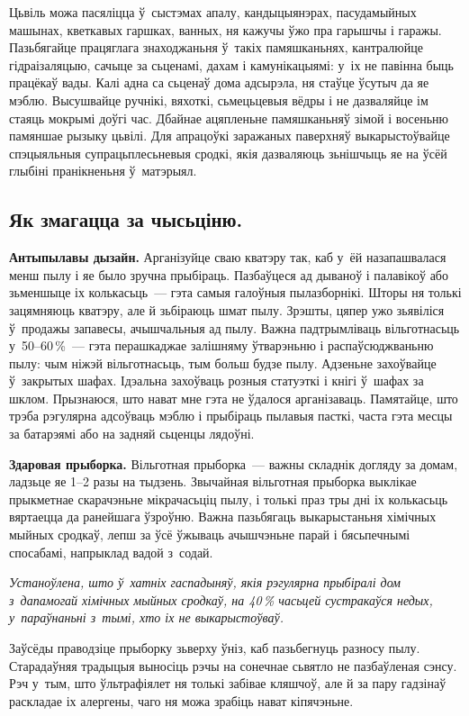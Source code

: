Цьвіль можа пасяліцца ў~сыстэмах апалу, кандыцыянэрах, пасудамыйных машынах, кветкавых гаршках, ванных, ня кажучы ўжо пра гарышчы і гаражы. Пазьбягайце працяглага знаходжаньня ў~такіх памяшканьнях, кантралюйце гідраізаляцыю, сачыце за сьценамі, дахам і камунікацыямі: у~іх не павінна быць працёкаў вады. Калі адна са сьценаў дома адсырэла, ня стаўце ўсутыч да яе мэблю. Высушвайце ручнікі, вяхоткі, сьмецьцевыя вёдры і не дазваляйце ім стаяць мокрымі доўгі час. Дбайнае ацяпленьне памяшканьняў зімой і восеньню памяншае рызыку цьвілі. Для апрацоўкі заражаных паверхняў выкарыстоўвайце спэцыяльныя супрацьплесьневыя сродкі, якія дазваляюць зьнішчыць яе на ўсёй глыбіні пранікненьня ў~матэрыял.

\subsection*{Як змагацца за чысьціню.}

\textbf{Антыпылавы дызайн.} Арганізуйце сваю кватэру так, каб у~ёй назапашвалася менш пылу і яе было зручна прыбіраць. Пазбаўцеся ад дываноў і палавікоў або зьменшыце іх колькасьць~--- гэта самыя галоўныя пылазборнікі. Шторы ня толькі зацямняюць кватэру, але й зьбіраюць шмат пылу. Зрэшты, цяпер ужо зьявіліся ў~продажы запавесы, ачышчальныя ад пылу. Важна падтрымліваць вільготнасьць у~50--60\,\%~--- гэта перашкаджае залішняму ўтварэньню і распаўсюджваньню пылу: чым ніжэй вільготнасьць, тым больш будзе пылу. Адзеньне захоўвайце ў~закрытых шафах. Ідэальна захоўваць розныя статуэткі і кнігі ў~шафах за шклом. Прызнаюся, што нават мне гэта не ўдалося арганізаваць. Памятайце, што трэба рэгулярна адсоўваць мэблю і прыбіраць пылавыя пасткі, часта гэта месцы за батарэямі або на задняй сьценцы лядоўні.

\textbf{Здаровая прыборка.} Вільготная прыборка~--- важны складнік догляду за домам, ладзьце яе 1--2 разы на тыдзень. Звычайная вільготная прыборка выклікае прыкметнае скарачэньне мікрачасьціц пылу, і толькі праз тры дні іх колькасьць вяртаецца да ранейшага ўзроўню. Важна пазьбягаць выкарыстаньня хімічных мыйных сродкаў, лепш за ўсё ўжываць ачышчэньне парай і бясьпечнымі спосабамі, напрыклад вадой з~содай.

\emph{Устаноўлена, што ў~хатніх гаспадыняў, якія рэгулярна прыбіралі дом з~дапамогай хімічных мыйных сродкаў, на 40\,\% часьцей сустракаўся недых, у~параўнаньні з~тымі, хто іх не выкарыстоўваў.}

Заўсёды праводзіце прыборку зьверху ўніз, каб пазьбегнуць разносу пылу. Старадаўняя традыцыя выносіць рэчы на сонечнае сьвятло не пазбаўленая сэнсу. Рэч у~тым, што ўльтрафіялет ня толькі забівае кляшчоў, але й за пару гадзінаў раскладае іх алергены, чаго ня можа зрабіць нават кіпячэньне.


